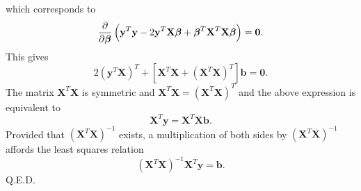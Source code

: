 which corresponds to
%
\begin{equation}
\frac{\partial}{\partial \mbox{\boldmath $\beta$}} \left( \mathbf{y}^T \mathbf{y} -
2\mathbf{y}^T\mathbf{X}\mbox{\boldmath $\beta$} +
\mbox{\boldmath $\beta$}^T\mathbf{X}^T\mathbf{X}\mbox{\boldmath $\beta$} \right) = \mathbf{0}.
\end{equation}
%
This gives
%
\begin{equation}
2(\mathbf{y}^T\mathbf{X})^T + \left[\mathbf{X}^T\mathbf{X} + (\mathbf{X}^T\mathbf{X})^T\right]\mathbf{b}  = \mathbf{0}.
\end{equation}
%
The matrix $\mathbf{X}^T\mathbf{X}$ is symmetric and $\mathbf{X}^T\mathbf{X} = (\mathbf{X}^T\mathbf{X})^T$ and the above expression is equivalent to
%
\begin{equation}
\mathbf{X}^T\mathbf{y} = \mathbf{X}^T\mathbf{Xb}.
\end{equation}
%
Provided that $(\mathbf{X}^T\mathbf{X})^{-1}$ exists, a multiplication of both sides by $(\mathbf{X}^T\mathbf{X})^{-1}$ affords the least squares relation
%
\begin{equation}
(\mathbf{X}^T\mathbf{X})^{-1}\mathbf{X}^T\mathbf{y} = \mathbf{b}.
\end{equation}
%
Q.E.D.
